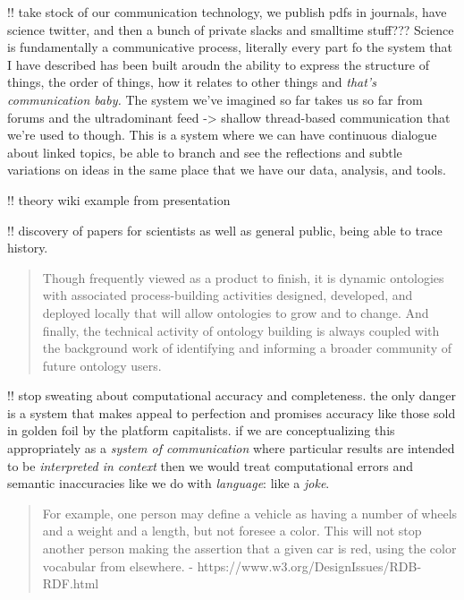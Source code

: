 \documentclass[10pt]{article}
\begin{document}
\begin{multicols}{2}
!! take stock of our communication technology, we publish pdfs in
journals, have science twitter, and then a bunch of private slacks and
smalltime stuff??? Science is fundamentally a communicative process,
literally every part fo the system that I have described has been built
aroudn the ability to express the structure of things, the order of
things, how it relates to other things and \emph{that's communication
baby.} The system we've imagined so far takes us so far from forums and
the ultradominant feed -\textgreater{} shallow thread-based
communication that we're used to though. This is a system where we can
have continuous dialogue about linked topics, be able to branch and see
the reflections and subtle variations on ideas in the same place that we
have our data, analysis, and tools.

!! theory wiki example from presentation

!! discovery of papers for scientists as well as general public, being
able to trace history.

\begin{quote}
Though frequently viewed as a product to finish, it is dynamic
ontologies with associated process-building activities designed,
developed, and deployed locally that will allow ontologies to grow and
to change. And finally, the technical activity of ontology building is
always coupled with the background work of identifying and informing a
broader community of future ontology users. \cite{bowkerInformationInfrastructureStudies2010} 
\end{quote}

!! stop sweating about computational accuracy and completeness. the only
danger is a system that makes appeal to perfection and promises accuracy
like those sold in golden foil by the platform capitalists. if we are
conceptualizing this appropriately as a \emph{system of communication}
where particular results are intended to be \emph{interpreted in
context} then we would treat computational errors and semantic
inaccuracies like we do with \emph{language}: like a \emph{joke}.

\begin{quote}
For example, one person may define a vehicle as having a number of
wheels and a weight and a length, but not foresee a color. This will not
stop another person making the assertion that a given car is red, using
the color vocabular from elsewhere. -
https://www.w3.org/DesignIssues/RDB-RDF.html
\end{quote}


\end{multicols}
\end{document}
